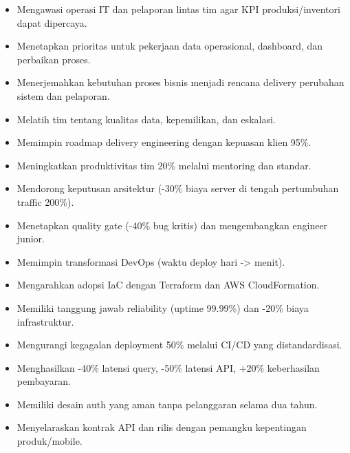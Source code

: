 
\begin{itemize}
\item Mengawasi operasi IT dan pelaporan lintas tim agar KPI produksi/inventori dapat dipercaya.
\item Menetapkan prioritas untuk pekerjaan data operasional, dashboard, dan perbaikan proses.
\item Menerjemahkan kebutuhan proses bisnis menjadi rencana delivery perubahan sistem dan pelaporan.
\item Melatih tim tentang kualitas data, kepemilikan, dan eskalasi.
\end{itemize}
\divider

\begin{itemize}
\item Memimpin roadmap delivery engineering dengan kepuasan klien 95\%.
\item Meningkatkan produktivitas tim 20\% melalui mentoring dan standar.
\item Mendorong keputusan arsitektur (-30\% biaya server di tengah pertumbuhan traffic 200\%).
\item Menetapkan quality gate (-40\% bug kritis) dan mengembangkan engineer junior.
\end{itemize}
\divider

\begin{itemize}
\item Memimpin transformasi DevOps (waktu deploy hari -> menit).
\item Mengarahkan adopsi IaC dengan Terraform dan AWS CloudFormation.
\item Memiliki tanggung jawab reliability (uptime 99.99\%) dan -20\% biaya infrastruktur.
\item Mengurangi kegagalan deployment 50\% melalui CI/CD yang distandardisasi.
\end{itemize}
\divider

\begin{itemize}
\item Menghasilkan -40\% latensi query, -50\% latensi API, +20\% keberhasilan pembayaran.
\item Memiliki desain auth yang aman tanpa pelanggaran selama dua tahun.
\item Menyelaraskan kontrak API dan rilis dengan pemangku kepentingan produk/mobile.
\end{itemize}
\divider

